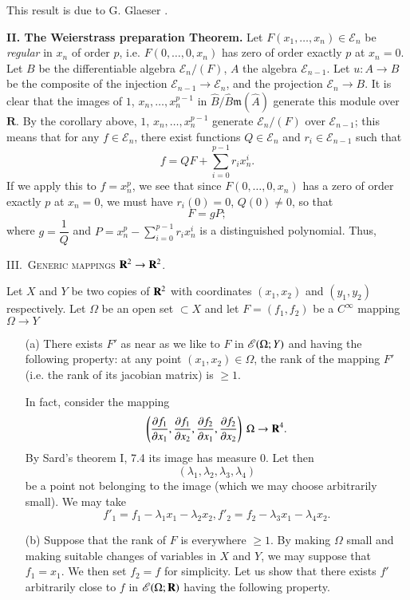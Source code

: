 This result is due to G. Glaeser \cite{G. Glaeser: 2}.

\medskip
\noindent
\textbf{II. The Weierstrass preparation Theorem.} Let $F(x_1, \ldots, x_n) \in \mathscr{E}_n$ be \textit{regular} in $x_n$ of order $p$, i.e. $F(0, \ldots, 0, x_n)$ has zero of order exactly $p$ at $x_n = 0$. Let $B$ be the differentiable algebra $\mathscr{E}_n/(F)$, $A$ the algebra $\mathscr{E}_{n-1}$. Let $u: A \to B$ be the composite of the injection $\mathscr{E}_{n-1} \to \mathscr{E}_n$, and the projection $\mathscr{E}_n \to B$. It is clear that the images of $1$, $x_n, \ldots, x^{p-1}_n$ in $\widehat{B}/ \widehat{B} \mathfrak{m}(\widehat{A})$ generate this module over $\mathbf{R}$. By the corollary above, $1$, $x_n, \ldots, x^{p-1}_n$ generate $\mathscr{E}_n/ (F)$ over $\mathscr{E}_{n-1}$; this means that for any $f \in \mathscr{E}_n$, there exist functions $Q \in \mathscr{E}_n$ and $r_i \in \mathscr{E}_{n-1}$ such that
$$
f = Q F + \sum\limits^{p-1}_{i=0} r_i x^i_n.
$$
If we apply this to $f =x^{p}_{n}$, we see that since $F(0,\ldots,0,x_{n})$ has a zero of order exactly $p$ at $x_{n}=0$, we must have $r_{i}(0)=0$, $Q(0)\neq 0$, so that
$$
F=gP;
$$
where $g=\dfrac{1}{Q}$ and $P=x^{p}_{n}-\sum\limits^{p-1}_{i=0} r_{i}x^{i}_{n}$ is a distinguished polynomial. Thus,

\medskip
III.~\textsc{Generic mappings \boldmath$\mathbf{R}^{2}\to \mathbf{R}^{2}$.}

Let $X$ and $Y$ be two copies of $\mathbf{R}^{2}$ with coordinates $(x_{1},x_{2})$ and $(y_{1},y_{2})$ respectively. Let $\Omega$ be an open set $\subset X$ and let $F=(f_{1},f_{2})$ be a $C^{\infty}$ mapping $\Omega\to Y$
\begin{itemize}
\item[(a)] There exists $F'$ as near as we like to $F$ in $\mathscr{E}(\Omega;Y)$ and having the following property: at any point $(x_{1},x_{2})\in \Omega$, the rank of the mapping $F'$ (i.e. the rank of its jacobian matrix) is $\geq 1$.

In fact, consider the mapping
$$
\left(\dfrac{\partial f_{1}}{\partial x_{1}}, \dfrac{\partial f_{1}}{\partial x_{2}}, \dfrac{\partial f_{2}}{\partial x_{1}},\dfrac{\partial f_{2}}{\partial x_{2}}\right) \ \Omega \to \mathbf{R}^{4}.
$$
By Sard's theorem I, 7.4 its image has measure $0$. Let then 
$$
(\lambda_{1},\lambda_{2},\lambda_{3},\lambda_{4})
$$ 
be a point not belonging to the image (which we may choose arbitrarily small). We may take
$$
f'_{1}=f_{1}-\lambda_{1}x_{1}-\lambda_{2}x_{2}, f'_{2}=f_{2}-\lambda_{3}x_{1}-\lambda_{4}x_{2}.
$$

\item[(b)] Suppose that the rank of $F$ is everywhere $\geq 1$. By making $\Omega$ small and making suitable changes of variables in $X$ and $Y$, we may suppose that $f_{1}=x_{1}$. We then set $f_{2}=f$ for simplicity. Let us show that there exists $f'$ arbitrarily close to $f$ in $\mathscr{E}(\Omega;\mathbf{R})$ having the following property.
\end{itemize}

